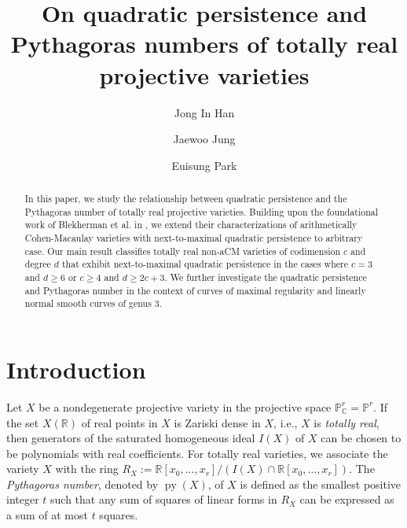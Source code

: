 \documentclass[11pt,letterpaper,reqno]{amsart}
\title[{Quadratic persistence and Pythagoras numbers of varieties}]{On quadratic persistence and Pythagoras numbers of totally real projective varieties}
\author{Jong In Han}
\author{Jaewoo Jung}
\author{Euisung Park}
\theoremstyle{plain}
\theoremstyle{definition}
\newtheorem{open problem}[theorem]{Open Problem}
\newtheorem{remark and notation}[theorem]{Remark and Notation}
\newtheorem{remark and definition}[theorem]{Remark and Definition}
\newtheorem{definition and notation}[theorem]{Definition and Notation}
\newtheorem{notation and convention}[theorem]{Notation and Convention}
\newtheorem{notation and remark}[theorem]{Notation and Remark}
\newtheorem{convention and notation}[theorem]{Convention and Notation}
\def \p {\mathbb{P}}
\def \r {\mathbb{R}}
\def \c {\mathbb{C}}
\def \py {\operatorname{py}}
\begin{document}
\begin{abstract}
In this paper, we study the relationship between quadratic persistence and the Pythagoras number of totally real projective varieties. Building upon the foundational work of Blekherman et al. in \cite{MR4397034}, we extend their characterizations of arithmetically Cohen-Macaulay varieties with next-to-maximal quadratic persistence to arbitrary case. Our main result classifies totally real non-aCM varieties of codimension $c$ and degree $d$ that exhibit next-to-maximal quadratic persistence in the cases where $c=3$ and $d \geq 6$ or $c \geq 4$ and $d \geq 2c+3$. We further investigate the quadratic persistence and Pythagoras number in the context of curves of maximal regularity and linearly normal smooth curves of genus 3.
\end{abstract}

\maketitle

\section{Introduction}
Let $X$ be a nondegenerate projective variety in the projective space $\p_{\c}^r = \p^r$.
If the set $X(\r)$ of real points in $X$ is Zariski dense in $X$, i.e., $X$ is \emph{totally real}, then generators of the saturated homogeneous ideal $I(X)$ of $X$ can be chosen to be polynomials with real coefficients. For totally real varieties, we associate the variety $X$ with the ring $R_X := \r[x_0, \dots, x_r]/(I(X) \cap \r[x_0, \dots, x_r])$.
The \emph{Pythagoras number}, denoted by $\py(X)$, of $X$ is defined as the smallest positive integer $t$ such that any sum of squares of linear forms in $R_X$ can be expressed as a sum of at most $t$ squares.
\end{document}
